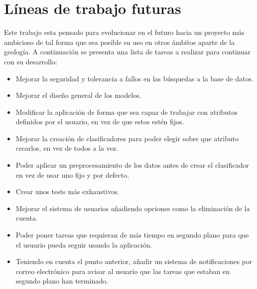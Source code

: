 \section{Líneas de trabajo futuras}

Este trabajo esta pensado para evolucionar en el futuro hacia un proyecto más
ambicioso de tal forma que sea posible su uso en otros ámbitos aparte de la
geología. A continuación se presenta una lista de tareas a realizar para
continuar con su desarrollo:
\begin{itemize}
	\item Mejorar la seguridad y tolerancia a fallos en las búsquedas a la base de
	datos.
	\item Mejorar el diseño general de los modelos.
	\item Modificar la aplicación de forma que sea capaz de trabajar con atributos
	definidos por el usuario, en vez de que estos estén fijos.
	\item Mejorar la creación de clasificadores para poder elegir sobre que
	atributo crearlos, en vez de todos a la vez.
	\item Poder aplicar un preprocesamiento de los datos antes de crear el
	clasificador en vez de usar uno fijo y por defecto.
	\item Crear unos tests más exhaustivos.
	\item Mejorar el sistema de usuarios añadiendo opciones como la eliminación de
	la cuenta.
	\item Poder poner tareas que requieran de más tiempo en segundo plano para que
	el usuario pueda seguir usando la aplicación.
	\item Teniendo en cuenta el punto anterior, añadir un sistema de
	notificaciones por correo electrónico para avisar al usuario que las tareas que
	estaban en segundo plano han terminado.
\end{itemize}

